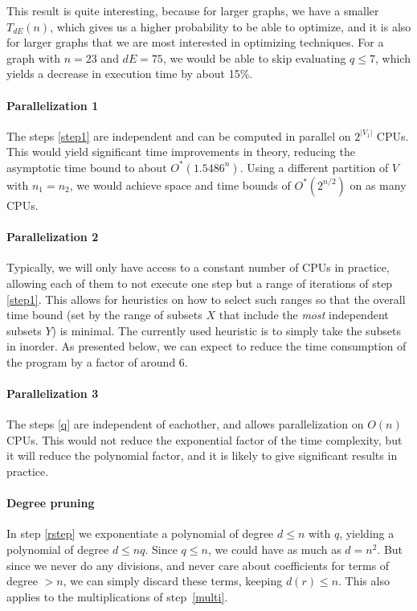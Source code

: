 \documentclass[a4paper]{article}
\begin{document}
This result is quite interesting, because for larger graphs, we have a smaller $T_{dE}(n)$, which gives us a higher probability to be able to optimize, and it is also for larger graphs that we are most interested in optimizing techniques. For a graph with $n=23$ and $dE = 75$, we would be able to skip evaluating $q\leq7$, which yields a decrease in execution time by about 15\%\footnotemark. %


\paragraph{Parallelization 1} The steps \ref{step1} are independent and can be computed in parallel on $2^{|V_1|}$ CPUs. This would yield significant time improvements in theory, reducing the asymptotic time bound to about $O^*(1.5486^n)$. Using a different partition of $V$ with $n_1 = n_2$, we would achieve space and time bounds of $O^*(2^{n/2})$ on as many CPUs. \cite{cov_pack}

\paragraph{Parallelization 2} Typically, we will only have access to a constant number of CPUs in practice, allowing each of them to not execute one step but a range of iterations of step \ref{step1}. This allows for heuristics on how to select such ranges so that the overall time bound (set by the range of subsets $X$ that include the \emph{most} independent subsets $Y$) is minimal. The currently used heuristic is to simply take the subsets in inorder. As presented below, we can expect to reduce the time consumption of the program by a factor of around 6. %

\paragraph{Parallelization 3} The steps \ref{q} are independent of eachother, and allows parallelization on $O(n)$ CPUs. This would not reduce the exponential factor of the time complexity, but it will reduce the polynomial factor, and it is likely to give significant results in practice.

\paragraph{Degree pruning} In step \ref{rstep} we exponentiate a polynomial of degree $d \leq n$ with $q$, yielding a polynomial of degree $d \leq nq$. Since $q \leq n$, we could have as much as $d = n^2$. But since we never do any divisions, and never care about coefficients for terms of degree $> n$, we can simply discard these terms, keeping $d(r) \leq n$. This also applies to the multiplications of step~\ref{multi}.
\end{document}
